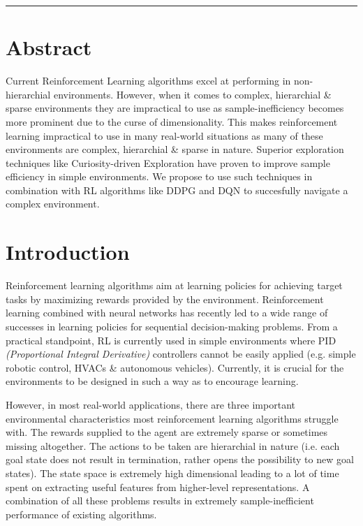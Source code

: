 \documentclass[12pt,a4paper]{article}
\begin{document}
\guide{*****}
\reviewtitle
\hrule

\section{Abstract}
Current Reinforcement Learning algorithms excel at performing in
non-hierarchial environments. However, when it comes to complex,
hierarchial \& sparse environments  they are impractical to use 
as sample-inefficiency becomes more prominent due to the curse of
dimensionality. This makes reinforcement learning impractical to 
use in many real-world situations as many  of these environments are 
complex, hierarchial \& sparse in  nature. Superior exploration techniques 
like Curiosity-driven Exploration have proven to improve sample efficiency 
in simple environments. We propose to use such techniques in combination 
with RL algorithms like DDPG and DQN to succesfully navigate a complex 
environment.

\section{Introduction}
Reinforcement learning algorithms aim at learning policies for achieving 
target tasks by maximizing rewards provided by the environment. Reinforcement
learning combined with neural networks has recently led to a wide range of 
successes in learning policies for sequential decision-making problems. From a
practical standpoint, RL is currently used in simple environments where PID 
\textit{(Proportional Integral Derivative)} controllers cannot be easily applied
(e.g. simple robotic control, HVACs \& autonomous vehicles). Currently, 
it is crucial for the environments to be designed in such a way as to encourage 
learning.

However, in most real-world applications, there are three important environmental
characteristics most reinforcement learning algorithms struggle with. The 
rewards supplied to the agent are extremely sparse or sometimes missing 
altogether. The actions  to be taken are hierarchial in nature (i.e. 
each goal state does not result in termination, rather opens the possibility 
to new goal states). The state space is extremely high dimensional leading 
to a lot of time spent on extracting useful features from higher-level 
representations. A combination of all these problems results in extremely 
sample-inefficient performance of existing algorithms.
\end{document}
